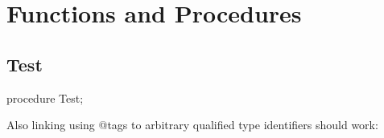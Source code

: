 \documentclass{report}
\begin{document}
\section{Functions and Procedures}
\subsection*{Test}
\begin{list}{}{
\setlength{\itemindent}{0cm}
\setlength{\listparindent}{0cm}
\setlength{\leftmargin}{\evensidemargin}
\addtolength{\leftmargin}{\tmplength}
\settowidth{\labelsep}{X}
\addtolength{\leftmargin}{\labelsep}
\setlength{\labelwidth}{\tmplength}
}
\begin{flushleft}
\item[\textbf{Declaration}\hfill]
\begin{ttfamily}
procedure Test;\end{ttfamily}


\end{flushleft}
\par
\item[\textbf{Description}]
Also linking using @tags to arbitrary qualified type identifiers should work:


\end{list}
\end{document}
